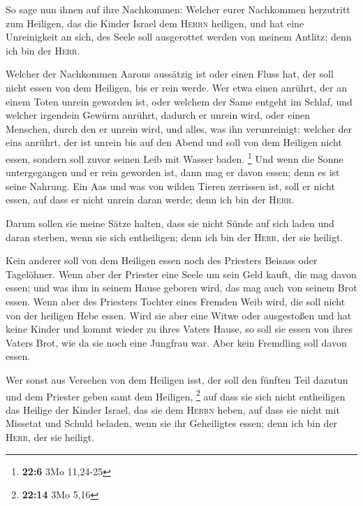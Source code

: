  So sage nun ihnen auf ihre Nachkommen: Welcher eurer
Nachkommen herzutritt zum Heiligen, das die Kinder Israel dem
\textsc{Herrn} heiligen, und hat eine Unreinigkeit an sich, des Seele
soll ausgerottet werden von meinem Antlitz; denn ich bin der
\textsc{Herr}.

 Welcher der Nachkommen Aarons aussätzig ist oder einen
Fluss hat, der soll nicht essen von dem Heiligen, bis er rein werde. Wer
etwa einen anrührt, der an einem Toten unrein geworden ist, oder welchem
der Same entgeht im Schlaf,  und welcher irgendein Gewürm
anrührt, dadurch er unrein wird, oder einen Menschen, durch den er
unrein wird, und alles, was ihn verunreinigt:  welcher der
eins anrührt, der ist unrein bis auf den Abend und soll von dem Heiligen
nicht essen, sondern soll zuvor seinen Leib mit Wasser baden.
\footnote{\textbf{22:6} 3Mo 11,24-25}  Und wenn die Sonne
untergegangen und er rein geworden ist, dann mag er davon essen; denn es
ist seine Nahrung.  Ein Aas und was von wilden Tieren
zerrissen ist, soll er nicht essen, auf dass er nicht unrein daran
werde; denn ich bin der \textsc{Herr}.

 Darum sollen sie meine Sätze halten, dass sie nicht Sünde
auf sich laden und daran sterben, wenn sie sich entheiligen; denn ich
bin der \textsc{Herr}, der sie heiligt.

 Kein anderer soll von dem Heiligen essen noch des
Priesters Beisass oder Tagelöhner.  Wenn aber der
Priester eine Seele um sein Geld kauft, die mag davon essen; und was ihm
in seinem Hause geboren wird, das mag auch von seinem Brot essen.
 Wenn aber des Priesters Tochter eines Fremden Weib wird,
die soll nicht von der heiligen Hebe essen.  Wird sie
aber eine Witwe oder ausgestoßen und hat keine Kinder und kommt wieder
zu ihres Vaters Hause, so soll sie essen von ihres Vaters Brot, wie da
sie noch eine Jungfrau war. Aber kein Fremdling soll davon essen.

 Wer sonst aus Versehen von dem Heiligen isst, der soll
den fünften Teil dazutun und dem Priester geben samt dem Heiligen,
\footnote{\textbf{22:14} 3Mo 5,16}  auf dass sie sich
nicht entheiligen das Heilige der Kinder Israel, das sie dem
\textsc{Herrn} heben,  auf dass sie nicht mit Missetat
und Schuld beladen, wenn sie ihr Geheiligtes essen; denn ich bin der
\textsc{Herr}, der sie heiligt.

